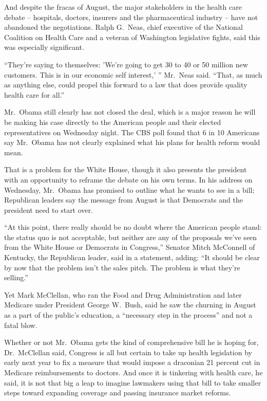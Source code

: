 ﻿\documentclass[12pt]{article}
\begin{document}
And despite the fracas of August, the major stakeholders in the health care debate -- hospitals,
doctors, insurers and the pharmaceutical industry -- have not abandoned the negotiations. Ralph
G.~Neas, chief executive of the National Coalition on Health Care and a veteran of Washington
legislative fights, said this was especially significant.

``They're saying to themselves: 'We're going to get 30 to 40 or 50 million new customers. This is in
our economic self interest,' '' Mr.~Neas said. ``That, as much as anything else, could propel this
forward to a law that does provide quality health care for all.''

Mr.~Obama still clearly has not closed the deal, which is a major reason he will be making his case
directly to the American people and their elected representatives on Wednesday night. The CBS poll
found that 6 in 10 Americans say Mr.~Obama has not clearly explained what his plans for health
reform would mean.

That is a problem for the White House, though it also presents the president with an opportunity to
reframe the debate on his own terms. In his address on Wednesday, Mr.~Obama has promised to outline
what he wants to see in a bill; Republican leaders say the message from August is that Democrats and
the president need to start over.

``At this point, there really should be no doubt where the American people stand: the status quo is
not acceptable, but neither are any of the proposals we've seen from the White House or Democrats in
Congress,'' Senator Mitch McConnell of Kentucky, the Republican leader, said in a statement, adding:
``It should be clear by now that the problem isn't the sales pitch. The problem is what they're
selling.''

Yet Mark McClellan, who ran the Food and Drug Administration and later Medicare under President
George W.~Bush, said he saw the churning in August as a part of the public's education, a
``necessary step in the process'' and not a fatal blow.

Whether or not Mr.~Obama gets the kind of comprehensive bill he is hoping for, Dr.~McClellan said,
Congress is all but certain to take up health legislation by early next year to fix a measure that
would impose a draconian 21 percent cut in Medicare reimbursements to doctors. And once it is
tinkering with health care, he said, it is not that big a leap to imagine lawmakers using that bill
to take smaller steps toward expanding coverage and passing insurance market reforms.
\end{document}
